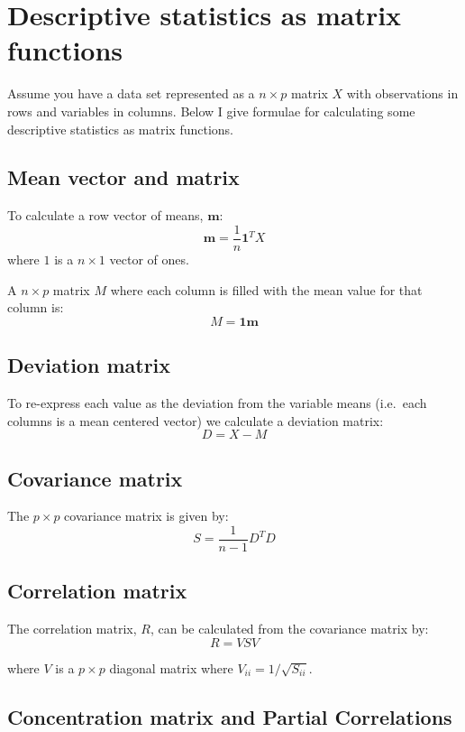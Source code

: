
\section{Descriptive statistics as matrix functions}

Assume you have a data set represented as a $n \times p$ matrix $X$ with
observations in rows and variables in columns. Below I give formulae for
calculating some descriptive statistics as matrix functions.

\subsection{Mean vector and matrix}

To calculate a row vector of means, $\mathbf{m}$: 
\[
\mathbf{m} = \frac{1}{n} \mathbf{1}^T  X
\] where $1$ is a $n \times 1$ vector of ones.

A $n \times p$ matrix $M$ where each column is filled with the mean
value for that column is: 
\[
M = \mathbf{1}\mathbf{m}
\]

\subsection{Deviation matrix}

To re-express each value as the deviation from the variable means
(i.e.~each columns is a mean centered vector) we calculate a deviation
matrix: 
\[
D = X - M
\]

\subsection{Covariance matrix}

The $p \times p$ covariance matrix is given by: 
\[
S = \frac{1}{n-1} D^T D
\]

\subsection{Correlation matrix}

The correlation matrix, $R$, can be calculated from the covariance
matrix by: 
\[
R = V S V
\]

where $V$ is a $p \times p$ diagonal matrix where
$V_{ii} = 1/\sqrt{S_{ii}}$.

\subsection{Concentration matrix and Partial Correlations}

